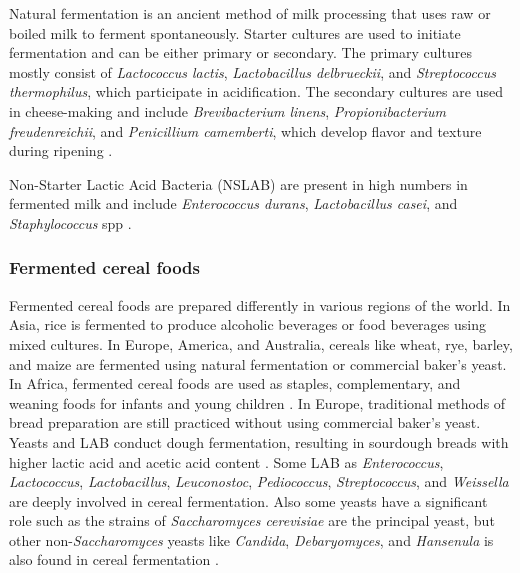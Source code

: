 Natural fermentation is an ancient method of milk processing that uses raw or boiled milk to ferment spontaneously. Starter cultures are used to initiate fermentation and can be either primary or secondary. The primary cultures mostly consist of \textit{Lactococcus lactis}, \textit{Lactobacillus delbrueckii}, and \textit{Streptococcus thermophilus}, which participate in acidification. The secondary cultures are used in cheese-making and include \textit{Brevibacterium linens}, \textit{Propionibacterium freudenreichii}, and \textit{Penicillium camemberti}, which develop flavor and texture during ripening \cite*{L1-DiversityMicro}.

Non-Starter Lactic Acid Bacteria (NSLAB) are present in high numbers in fermented milk and include \textit{Enterococcus durans}, \textit{Lactobacillus casei}, and \textit{Staphylococcus} spp \cite*{L1-DiversityMicro}.

\subsubsection*{Fermented cereal foods}

Fermented cereal foods are prepared differently in various regions of the world. In Asia, rice is fermented to produce alcoholic beverages or food beverages using mixed cultures. In Europe, America, and Australia, cereals like wheat, rye, barley, and maize are fermented using natural fermentation or commercial baker's yeast. In Africa, fermented cereal foods are used as staples, complementary, and weaning foods for infants and young children \cite*{L1-DiversityMicro}.
In Europe, traditional methods of bread preparation are still practiced without using commercial baker's yeast. Yeasts and LAB conduct dough fermentation, resulting in sourdough breads with higher lactic acid and acetic acid content \cite*{L1-DiversityMicro}.
Some LAB as \textit{Enterococcus}, \textit{Lactococcus}, \textit{Lactobacillus}, \textit{Leuconostoc}, \textit{Pediococcus}, \textit{Streptococcus}, and \textit{Weissella} are deeply involved in cereal fermentation. Also some yeasts have a significant role such as the strains of \textit{Saccharomyces cerevisiae} are the principal yeast, but other non-\textit{Saccharomyces} yeasts like \textit{Candida}, \textit{Debaryomyces}, and \textit{Hansenula} is also found in cereal fermentation \cite*{L1-DiversityMicro}.

